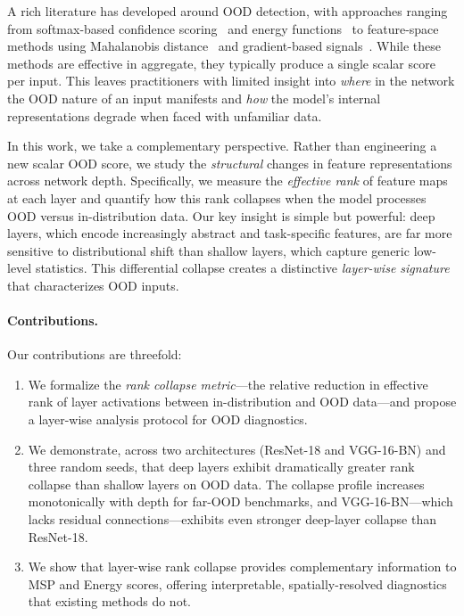 \documentclass{article}
\begin{document}
A rich literature has developed around OOD detection, with approaches ranging from softmax-based confidence scoring~\citep{hendrycks2017baseline} and energy functions~\citep{liu2020energy} to feature-space methods using Mahalanobis distance~\citep{lee2018simple} and gradient-based signals~\citep{huang2021importance}. While these methods are effective in aggregate, they typically produce a single scalar score per input. This leaves practitioners with limited insight into \emph{where} in the network the OOD nature of an input manifests and \emph{how} the model's internal representations degrade when faced with unfamiliar data.

In this work, we take a complementary perspective. Rather than engineering a new scalar OOD score, we study the \emph{structural} changes in feature representations across network depth. Specifically, we measure the \emph{effective rank} of feature maps at each layer and quantify how this rank collapses when the model processes OOD versus in-distribution data. Our key insight is simple but powerful: deep layers, which encode increasingly abstract and task-specific features, are far more sensitive to distributional shift than shallow layers, which capture generic low-level statistics. This differential collapse creates a distinctive \emph{layer-wise signature} that characterizes OOD inputs.

\paragraph{Contributions.} Our contributions are threefold:
\begin{enumerate}
    \item We formalize the \emph{rank collapse metric}---the relative reduction in effective rank of layer activations between in-distribution and OOD data---and propose a layer-wise analysis protocol for OOD diagnostics.
    \item We demonstrate, across two architectures (ResNet-18 and VGG-16-BN) and three random seeds, that deep layers exhibit dramatically greater rank collapse than shallow layers on OOD data. The collapse profile increases monotonically with depth for far-OOD benchmarks, and VGG-16-BN---which lacks residual connections---exhibits even stronger deep-layer collapse than ResNet-18.
    \item We show that layer-wise rank collapse provides complementary information to MSP and Energy scores, offering interpretable, spatially-resolved diagnostics that existing methods do not.
\end{enumerate}
\end{document}
